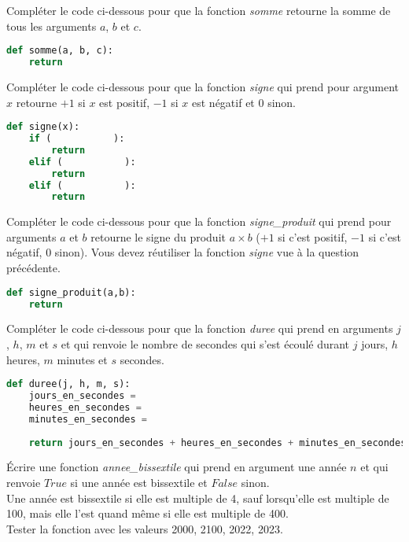 \documentclass[11pt]{exam}
\begin{document}
\begin{questions}

\question Compléter le code ci-dessous pour que la fonction \emph{somme} retourne la somme de tous les arguments $a$, $b$ et $c$.

\begin{lstlisting}[language=Python]
def somme(a, b, c):
    return 
\end{lstlisting}

\question Compléter le code ci-dessous pour que la fonction \emph{signe} qui prend pour argument $x$ retourne $+1$ si $x$ est positif, $-1$ si $x$ est négatif et $0$ sinon.

\begin{lstlisting}[language=Python]
def signe(x):
    if (           ):
        return 
    elif (           ):
        return 
    elif (           ):
        return
\end{lstlisting}

\question Compléter le code ci-dessous pour que la fonction \emph{signe\_produit} qui prend pour arguments $a$ et $b$ retourne le signe du produit $a\times b$ ($+1$ si c'est positif, $-1$ si c'est négatif, $0$ sinon). Vous devez réutiliser la fonction \emph{signe} vue à la question précédente.

\begin{lstlisting}[language=Python]
def signe_produit(a,b):
    return 
\end{lstlisting}

\question Compléter le code ci-dessous pour que la fonction \emph{duree} qui prend en arguments $j$, $h$, $m$ et $s$ et qui renvoie le nombre de secondes qui s'est écoulé durant $j$ jours, $h$ heures, $m$ minutes et $s$ secondes.

\begin{lstlisting}[language=Python]
def duree(j, h, m, s):
    jours_en_secondes = 
    heures_en_secondes = 
    minutes_en_secondes = 
    
    return jours_en_secondes + heures_en_secondes + minutes_en_secondes + s
\end{lstlisting}

\question Écrire une fonction \emph{annee\_bissextile} qui prend en argument une année $n$ et qui renvoie $True$ si une année est bissextile et $False$ sinon.\\
Une année est bissextile si elle est multiple de 4, sauf lorsqu'elle est multiple de 100, mais elle l'est quand même si elle est multiple de 400.\\[1em]
Tester la fonction avec les valeurs 2000, 2100, 2022, 2023.


\end{questions}
\end{document}
